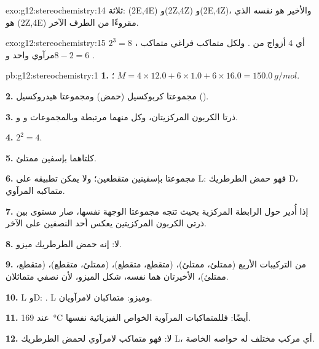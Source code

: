 \begin{solution}{exo:g12:stereochemistry:14}
ثلاثة: (2E,4E) و(2Z,4Z) و(2E,4Z)، والأخير هو  نفسه الذي هو
(2Z,4E) مقروءًا من الطرف الآخر.
\end{solution}

\begin{solution}{exo:g12:stereochemistry:15}
$2^3 = 8$ ، أي 4 أزواج من . ولكل
متماكب فراغي متماكب مرآوي واحد و$8 - 2 = 6$ .
\end{solution}

\begin{solution}{pb:g12:stereochemistry:1}
\textbf{1.} ؛ $M = 4 \times 12.0 + 6 \times 1.0 + 6 \times 16.0
= \qty{150.0}{g/mol}$.

\textbf{2.} مجموعتا كربوكسيل (حمض) ومجموعتا هيدروكسيل
().

\textbf{3.} ذرتا الكربون المركزيتان، وكل منهما مرتبطة   وبالمجموعات 
و و.

\textbf{4.} $2^2 = 4$.

\textbf{5.} كلتاهما بإسفين ممتلئ.

\textbf{6.} مجموعتا  بإسفينين متقطعين؛ ولا يمكن تطبيقه على
L: فهو حمض الطرطريك D، متماكبه المرآوي.

\textbf{7.} إذا أُدير حول الرابطة المركزية بحيث تتجه مجموعتا 
الوجهة نفسها، صار  مستوى بين ذرتي الكربون المركزيتين
يعكس أحد النصفين على الآخر.

\textbf{8.} لا: إنه حمض الطرطريك ميزو.

\textbf{9.} من التركيبات الأربع (ممتلئ، ممتلئ)، (متقطع، متقطع)،
(ممتلئ، متقطع)، (متقطع، ممتلئ)، الأخيرتان هما  نفسه،
شكل الميزو، لأن نصفي  متماثلان.

\textbf{10.} L وD: . L وميزو: متماكبان لامرآويان.

\textbf{11.} عند \qty{169}{\celsius} أيضًا: فللمتماكبات المرآوية الخواص
الفيزيائية نفسها.

\textbf{12.} لا: فهو متماكب لامرآوي لحمض الطرطريك L، أي مركب مختلف
له خواصه الخاصة.


\end{solution}
